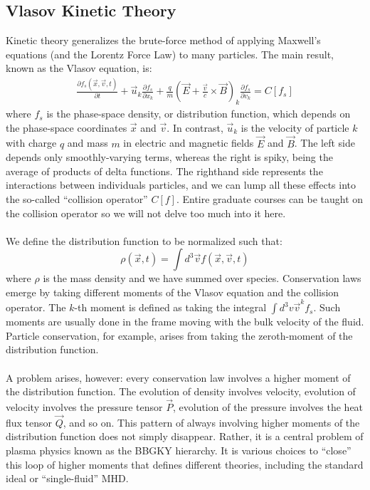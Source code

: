 
\subsection{Vlasov Kinetic Theory} \label{ssec:vlasov}
Kinetic theory generalizes the brute-force method of applying Maxwell's equations (and the Lorentz Force Law) to many particles. The main result, known as the Vlasov equation, is:
\begin{align}
  \frac{\partial f_s(\vec x,\vec v,t)}{\partial t}+\vec u_k\frac{\partial f_s}{\partial x_k}+\frac qm (\vec E+\frac{\vec v}{c}\times\vec B)_k\frac{\partial f_s}{\partial v_k}=C[f_s] \label{eq:vlasov}
\end{align}
where $f_s$ is the phase-space density, or distribution function, which depends on the phase-space coordinates $\vec x$ and $\vec v$. In contrast, $\vec u_k$ is the velocity of particle $k$ with charge $q$ and mass $m$ in electric and magnetic fields $\vec E$ and $\vec B$. The left side depends only smoothly-varying terms, whereas the right is spiky, being the average of products of delta functions. The righthand side represents the interactions between individuals particles, and we can lump all these effects into the so-called ``collision operator'' $C[f]$. Entire graduate courses can be taught on the collision operator so we will not delve too much into it here.\\
\\
We define the distribution function to be normalized such that:
\begin{equation}
  \rho(\vec x,t)=\int d^3\vec v f(\vec x,\vec v, t)\label{eq:nnorm}
\end{equation}
where $\rho$ is the mass density and we have summed over species. Conservation laws emerge by taking different moments of the Vlasov equation and the collision operator. The $k$-th moment is defined as taking the integral $\int d^3v \vec v^k f_s$. Such moments are usually done in the frame moving with the bulk velocity of the fluid. Particle conservation, for example, arises from taking the zeroth-moment of the distribution function. \\
\\
A problem arises, however: every conservation law involves a higher moment of the distribution function. The evolution of density involves velocity, evolution of velocity involves the pressure tensor $\vec P$, evolution of the pressure involves the heat flux tensor $\vec Q$, and so on. This pattern of always involving higher moments of the distribution function does not simply disappear. Rather, it is a central problem of plasma physics known as the BBGKY hierarchy. It is various choices to ``close'' this loop of higher moments that defines different theories, including the standard ideal or ``single-fluid'' MHD. \\
